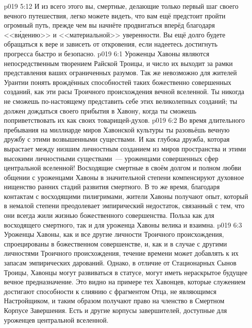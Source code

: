 \vs p019 5:12 И из всего этого вы, смертные, делающие только первый шаг своего вечного путешествия, легко можете видеть, что вам ещё предстоит пройти огромный путь, прежде чем вы начнёте продвигаться вперёд благодаря <<в\'идению>> и <<материальной>> уверенности. Вы ещё долго будете обращаться к вере и зависеть от откровения, если надеетесь достигнуть прогресса быстро и безопасно.
\vs p019 6:1 Уроженцы Хавоны являются непосредственным творением Райской Троицы, и число их выходит за рамки представления ваших ограниченных разумов. Так же невозможно для жителей Урантии понять врождённых способностей таких божественно совершенных созданий, как эти расы Троичного происхождения вечной вселенной. Ты никогда не сможешь по\hyp{}настоящему представить себе этих великолепных созданий; ты должен дождаться своего прибытия в Хавону, когда ты сможешь поприветствовать их как своих товарищей\hyp{}духов.
\vs p019 6:2 Во время длительного пребывания на миллиарде миров Хавонской культуры ты разовьёшь вечную дружбу с этими возвышенными существами. И как глубока дружба, которая вырастает между низшим личностным созданием из миров пространства и этими высокими личностными существами~--- уроженцами совершенных сфер центральной вселенной! Восходящие смертные в своём долгом и полном любви общении с уроженцами Хавоны в значительной степени компенсируют духовное нищенство ранних стадий развития смертного. В то же время, благодаря контактам с восходящими пилигримами, жители Хавоны получают опыт, который в немалой степени преодолевает эмпирический недостаток, связанный с тем, что они всегда жили жизнью божественного совершенства. Польза как для восходящего смертного, так и для уроженца Хавоны велика и взаимна.
\vs p019 6:3 \pc Уроженцы Хавоны, как и все другие личности Троичного происхождения, спроецированы в божественном совершенстве, и, как и в случае с другими личностями Троичного происхождения, течение времени может добавлять к их запасам эмпирических дарований. Однако, в отличие от Стационарных Сынов Троицы, Хавонцы могут развиваться в статусе, могут иметь нераскрытое будущее вечное предназначение. Это видно на примере тех Хавонцев, которые служением достигают способности к слиянию с фрагментом Отца, не являющимся Настройщиком, и таким образом получают право на членство в Смертном Корпусе Завершения. Есть и другие корпусы завершителей, доступные для уроженцев центральной вселенной.
